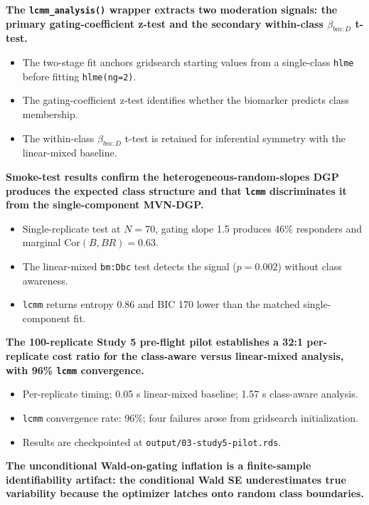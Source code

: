 \documentclass[
  11pt,
]{article}
\begin{document}
\textbf{The \texttt{lcmm\_analysis()} wrapper extracts two moderation
signals: the primary gating-coefficient z-test and the secondary
within-class $\beta_{bm:D}$ t-test.}

\begin{itemize}\setlength{\itemsep}{2pt}\setlength{\parskip}{0pt}
\item The two-stage fit anchors gridsearch starting values from a
  single-class \texttt{hlme} before fitting \texttt{hlme(ng=2)}.
\item The gating-coefficient z-test identifies whether the biomarker
  predicts class membership.
\item The within-class $\beta_{bm:D}$ t-test is retained for
  inferential symmetry with the linear-mixed baseline.
\end{itemize}

\textbf{Smoke-test results confirm the heterogeneous-random-slopes DGP
produces the expected class structure and that \texttt{lcmm}
discriminates it from the single-component MVN-DGP.}

\begin{itemize}\setlength{\itemsep}{2pt}\setlength{\parskip}{0pt}
\item Single-replicate test at $N = 70$, gating slope 1.5 produces
  46\% responders and marginal $\mathrm{Cor}(B, BR) = 0.63$.
\item The linear-mixed \texttt{bm:Dbc} test detects the signal
  ($p = 0.002$) without class awareness.
\item \texttt{lcmm} returns entropy 0.86 and BIC 170 lower than the
  matched single-component fit.
\end{itemize}

\textbf{The 100-replicate Study 5 pre-flight pilot establishes a 32:1
per-replicate cost ratio for the class-aware versus linear-mixed
analysis, with 96\% \texttt{lcmm} convergence.}

\begin{itemize}\setlength{\itemsep}{2pt}\setlength{\parskip}{0pt}
\item Per-replicate timing: 0.05 s linear-mixed baseline; 1.57 s
  class-aware analysis.
\item \texttt{lcmm} convergence rate: 96\%; four failures arose from
  gridsearch initialization.
\item Results are checkpointed at \texttt{output/03-study5-pilot.rds}.
\end{itemize}

\textbf{The unconditional Wald-on-gating inflation is a finite-sample
identifiability artifact: the conditional Wald SE underestimates true
variability because the optimizer latches onto random class boundaries.}
\end{document}

